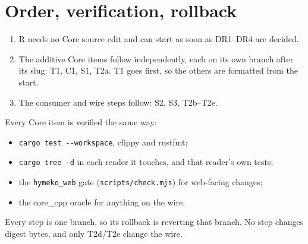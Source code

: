 \documentclass[11pt,a4paper]{article}
\newcommand{\code}[1]{\texttt{#1}}
\begin{document}
\section{Order, verification, rollback}
\begin{enumerate}[nosep]
\item R needs no Core source edit and can start as soon as DR1--DR4 are decided.
\item The additive Core items follow independently, each on its own branch after its slug: T1, C1, S1, T2a.
  T1 goes first, so the others are formatted from the start.
\item The consumer and wire steps follow: S2, S3, T2b--T2e.
\end{enumerate}
Every Core item is verified the same way:
\begin{itemize}[nosep]
\item \code{cargo test -{}-workspace}, clippy and rustfmt;
\item \code{cargo tree -d} in each reader it touches, and that reader's own tests;
\item the \code{hymeko\_web} gate (\code{scripts/check.mjs}) for web-facing changes;
\item the core\_cpp oracle for anything on the wire.
\end{itemize}
Every step is one branch, so its rollback is reverting that branch. No step changes digest bytes, and only
T2d/T2e change the wire.

\begin{center}

\end{center}
\end{document}
